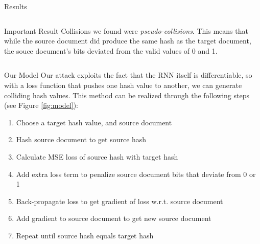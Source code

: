 \documentclass[final]{beamer}
\newlength{\onecolwid}
\newlength{\twocolwid}
\begin{document}
\begin{frame}[t]
\begin{columns}[t]
\begin{column}{\twocolwid}
\begin{columns}[t,totalwidth=\twocolwid]
\begin{column}{\onecolwid}
\begin{block}{Results}
\end{block}


\end{column} %

\end{columns} %


\begin{alertblock}{Important Result}
    Collisions we found were \emph{pseudo-collisions}. This means that while the
    source document did produce the same hash as the target document, the souce
    document's bits deviated from the valid values of 0 and 1.
\end{alertblock} 


\begin{columns}[t,totalwidth=\twocolwid] %

\begin{column}{\onecolwid} %


\begin{block}{Our Model}
Our attack exploits the fact that the RNN itself is differentiable, so with a loss
function that pushes one hash value to another, we can generate colliding
hash values.
This method can be realized through the following steps (see Figure \ref{fig:model}):
\begin{enumerate}
    \item Choose a target hash value, and source document
    \item Hash source document to get source hash
    \item Calculate MSE loss of source hash with target hash
    \item Add extra loss term to penalize source document bits that deviate from 0 or 1
    \item Back-propagate loss to get gradient of loss w.r.t. source document
    \item Add gradient to source document to get new source document
    \item Repeat until source hash equals target hash
\end{enumerate}
\end{block}


\end{column}
\end{columns}
\end{column}
\end{columns}
\end{frame}
\end{document}
